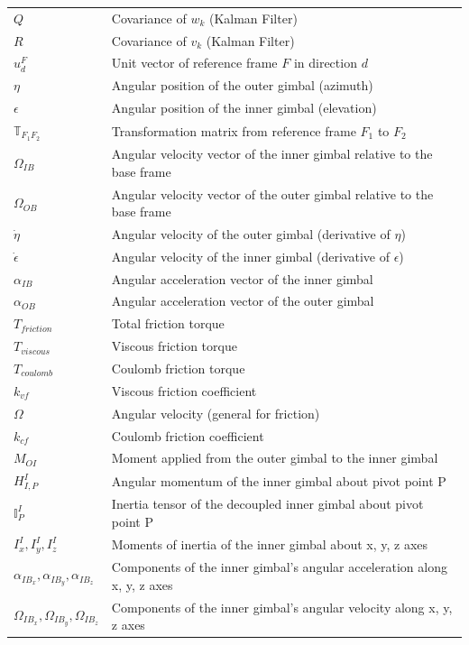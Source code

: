 \begin{longtable}{ll}
$Q$ & Covariance of $w_k$ (Kalman Filter) \\
$R$ & Covariance of $v_k$ (Kalman Filter) \\
$u_d^F$ & Unit vector of reference frame $F$ in direction $d$ \\
$\eta$ & Angular position of the outer gimbal (azimuth) \\
$\epsilon$ & Angular position of the inner gimbal (elevation) \\
$\mathbb{T}_{F_1F_2}$ & Transformation matrix from reference frame $F_1$ to $F_2$ \\
$\Omega_{IB}$ & Angular velocity vector of the inner gimbal relative to the base frame \\
$\Omega_{OB}$ & Angular velocity vector of the outer gimbal relative to the base frame \\
$\dot{\eta}$ & Angular velocity of the outer gimbal (derivative of $\eta$) \\
$\dot{\epsilon}$ & Angular velocity of the inner gimbal (derivative of $\epsilon$) \\
$\alpha_{IB}$ & Angular acceleration vector of the inner gimbal \\
$\alpha_{OB}$ & Angular acceleration vector of the outer gimbal \\
$T_{friction}$ & Total friction torque \\
$T_{viscous}$ & Viscous friction torque \\
$T_{coulomb}$ & Coulomb friction torque \\
$k_{vf}$ & Viscous friction coefficient \\
$\Omega$ & Angular velocity (general for friction) \\
$k_{cf}$ & Coulomb friction coefficient \\
$M_{OI}$ & Moment applied from the outer gimbal to the inner gimbal \\
$H_{I,P}^I$ & Angular momentum of the inner gimbal about pivot point P \\
$\mathbb{I}_{P}^{I}$ & Inertia tensor of the decoupled inner gimbal about pivot point P \\
$I_x^I, I_y^I, I_z^I$ & Moments of inertia of the inner gimbal about x, y, z axes \\
$\alpha_{IB_x}, \alpha_{IB_y}, \alpha_{IB_z}$ & Components of the inner gimbal's angular acceleration along x, y, z axes \\
$\Omega_{IB_x}, \Omega_{IB_y}, \Omega_{IB_z}$ & Components of the inner gimbal's angular velocity along x, y, z axes \\

\end{longtable}
